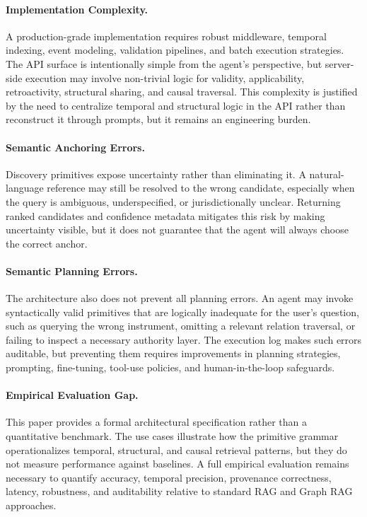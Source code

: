 \documentclass[11pt]{article}
\begin{document}
\paragraph{Implementation Complexity.}
A production-grade implementation requires robust middleware, temporal indexing, event modeling, validation pipelines, and batch execution strategies. The API surface is intentionally simple from the agent's perspective, but server-side execution may involve non-trivial logic for validity, applicability, retroactivity, structural sharing, and causal traversal. This complexity is justified by the need to centralize temporal and structural logic in the API rather than reconstruct it through prompts, but it remains an engineering burden.

\paragraph{Semantic Anchoring Errors.}
Discovery primitives expose uncertainty rather than eliminating it. A natural-language reference may still be resolved to the wrong candidate, especially when the query is ambiguous, underspecified, or jurisdictionally unclear. Returning ranked candidates and confidence metadata mitigates this risk by making uncertainty visible, but it does not guarantee that the agent will always choose the correct anchor.

\paragraph{Semantic Planning Errors.}
The architecture also does not prevent all planning errors. An agent may invoke syntactically valid primitives that are logically inadequate for the user's question, such as querying the wrong instrument, omitting a relevant relation traversal, or failing to inspect a necessary authority layer. The execution log makes such errors auditable, but preventing them requires improvements in planning strategies, prompting, fine-tuning, tool-use policies, and human-in-the-loop safeguards.

\paragraph{Empirical Evaluation Gap.}
This paper provides a formal architectural specification rather than a quantitative benchmark. The use cases illustrate how the primitive grammar operationalizes temporal, structural, and causal retrieval patterns, but they do not measure performance against baselines. A full empirical evaluation remains necessary to quantify accuracy, temporal precision, provenance correctness, latency, robustness, and auditability relative to standard RAG and Graph RAG approaches.
\end{document}
